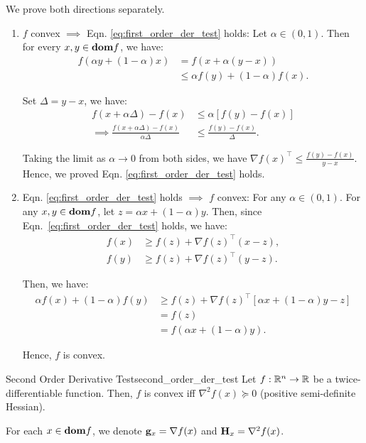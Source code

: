 \begin{proof*}
	We prove both directions separately.
	\begin{enumerate}[label=(\roman*)]
		\item $f$ convex $\implies$ Eqn. \eqref{eq:first_order_der_test} holds: Let $\alpha\in(0,1)$. Then for every $x, y\in{\mathrm{\bf dom}} f$, we have:
		\begin{align*}
			f(\alpha y + (1-\alpha)x) &= f(x+\alpha(y-x)) \\
			 	&\le \alpha f(y) + (1-\alpha)f(x).
		\end{align*} 

		\noindent Set $\Delta=y-x$, we have:
		\begin{align*}
			f(x+\alpha\Delta) - f(x) &\le \alpha [f(y) - f(x)] \\
			\implies
			\frac{f(x+\alpha\Delta) - f(x)}{\alpha\Delta} &\le \frac{f(y) - f(x)}{\Delta}.
		\end{align*}

		\noindent Taking the limit as $\alpha\to 0$ from both sides, we have $\nabla f(x)^\top\le \frac{f(y)-f(x)}{y-x}$. Hence, we proved Eqn. \eqref{eq:first_order_der_test} holds.

		\item Eqn. \eqref{eq:first_order_der_test} holds $\implies$ $f$ convex: For any $\alpha\in(0,1)$. For any $x, y\in{\mathrm{\bf dom}} f$, let $z=\alpha x + (1-\alpha)y$. Then, since Eqn.~\eqref{eq:first_order_der_test} holds, we have:
		\begin{align*}
			f(x) &\ge f(z) + \nabla f(z)^\top (x-z), \\
			f(y) &\ge f(z) + \nabla f(z)^\top (y-z).
		\end{align*} 

		\noindent Then, we have:
		\begin{align*}
			\alpha f(x) + (1-\alpha) f(y) &\ge f(z) + \nabla f(z)^\top [\alpha x + (1-\alpha)y - z] \\
			&= f(z) \\
			&= f(\alpha x + (1-\alpha)y).
		\end{align*} 

		\noindent Hence, $f$ is convex.
	\end{enumerate} 	
\end{proof*} 

\begin{proposition}{Second Order Derivative Test}{second_order_der_test}
	Let $f:\mathbb{R}^n\to\mathbb{R}$ be a twice-differentiable function. Then, $f$ is convex iff $\nabla^2 f(x)\succeq	0$ (positive semi-definite Hessian).
\end{proposition} 

\begin{proof*}
	For each $x\in{\mathrm{\bf dom}} f$, we denote ${\bf g}_x=\nabla f(x)$ and ${\bf H}_x=\nabla^2f(x)$.
\end{proof*} 


